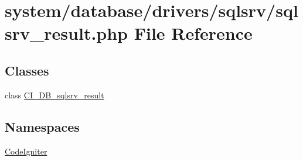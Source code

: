 \hypertarget{sqlsrv__result_8php}{}\section{system/database/drivers/sqlsrv/sqlsrv\+\_\+result.php File Reference}
\label{sqlsrv__result_8php}
\subsection*{Classes}
\begin{DoxyCompactItemize}
\item 
class \mbox{\hyperlink{class_c_i___d_b__sqlsrv__result}{C\+I\+\_\+\+D\+B\+\_\+sqlsrv\+\_\+result}}
\end{DoxyCompactItemize}
\subsection*{Namespaces}
\begin{DoxyCompactItemize}
\item 
 \mbox{\hyperlink{namespace_code_igniter}{Code\+Igniter}}
\end{DoxyCompactItemize}

